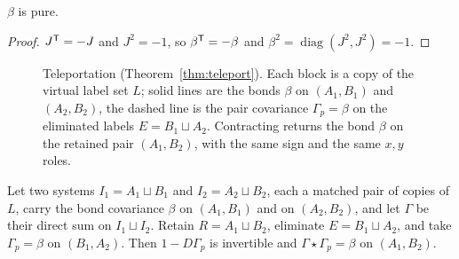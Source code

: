 \begin{theorem}\label{thm:bond-pure}
$\beta$ is pure.
\end{theorem}
\begin{proof}
$J^{\mathsf T}=-J$ and $J^2=-1$, so $\beta^{\mathsf T}=-\beta$ and
$\beta^2=\operatorname{diag}(J^2,J^2)=-1$.
\end{proof}

\begin{figure}[t]
\centering
{}
\caption{Teleportation (Theorem~\ref{thm:teleport}). Each block is a copy of the
virtual label set $L$; solid lines are the bonds $\beta$ on $(A_1,B_1)$ and $(A_2,B_2)$,
the dashed line is the pair covariance $\Gamma_p=\beta$ on the eliminated labels
$E=B_1\sqcup A_2$. Contracting returns the bond $\beta$ on the retained pair $(A_1,B_2)$,
with the same sign and the same $x,y$ roles.}
\label{fig:teleport}
\end{figure}
\begin{theorem}[Teleportation]\label{thm:teleport}
Let two systems $I_1=A_1\sqcup B_1$ and $I_2=A_2\sqcup B_2$, each a matched pair of
copies of $L$, carry the bond covariance $\beta$ on $(A_1,B_1)$ and on $(A_2,B_2)$, and
let $\Gamma$ be their direct sum on $I_1\sqcup I_2$. Retain $R=A_1\sqcup B_2$,
eliminate $E=B_1\sqcup A_2$, and take $\Gamma_p=\beta$ on $(B_1,A_2)$. Then
$1-D\Gamma_p$ is invertible and $\Gamma\star\Gamma_p=\beta$ on $(A_1,B_2)$.
\end{theorem}
